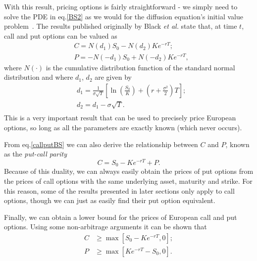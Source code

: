 With this result, pricing options is fairly straightforward - we simply need to solve the PDE in eq.\eqref{BS2} as we would for the diffusion equation's initial value problem~\citep{Dilao}.
The results published originally by Black \textit{et al.} state that, at time $t$, call and put options can be valued as
\begin{equation}\label{callputBS}
\begin{split}
&C=N(d_1)S_0-N(d_2)Ke^{-rT};\\
&P=-N(-d_1)S_0+N(-d_2)Ke^{-rT},
\end{split}
\end{equation}
\noindent where $N(\cdot)$ is the cumulative distribution function of the standard normal distribution and where $d_1$, $d_2$ are given by
\begin{equation}\label{d1d2}
\begin{split}
&d_1=\frac{1}{\sigma\sqrt{T}}\left[\ln\left(\frac{S_0}{K}\right)+\left(r+\frac{\sigma^2}{2}\right)T\right];\\
&d_2=d_1-\sigma\sqrt{T}.\\
\end{split}
\end{equation}
\noindent This is a very important result that can be used to precisely price European options, so long as all the parameters are exactly known (which never occurs).


From eq.\eqref{callputBS} we can also derive the relationship between $C$ and $P$, known as the \emph{put-call parity}
\begin{equation}
C=S_0-Ke^{-rT}+P.
\end{equation}
\noindent Because of this duality, we can always easily obtain the prices of put options from the prices of call options with the same underlying asset, maturity and strike. For this reason, some of the results presented in later sections only apply to call options, though we can just as easily find their put option equivalent.


Finally, we can obtain a lower bound for the prices of European call and put options. Using some non-arbitrage arguments it can be shown that
\begin{equation}\label{bound}
\begin{split}
C&\geq \max\left[S_0-Ke^{-rT},0\right];\\
P&\geq \max\left[Ke^{-rT}-S_0,0\right].
\end{split}
\end{equation}